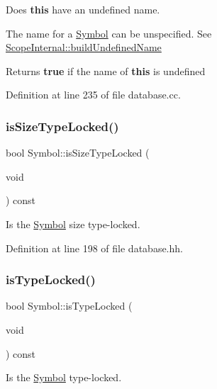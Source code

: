 Does {\bfseries{this}} have an undefined name. 

The name for a \mbox{\hyperlink{class_symbol}{Symbol}} can be unspecified. See \mbox{\hyperlink{class_scope_internal_a17225ae39210e0dbf1efb1a3ee847d72}{Scope\+Internal\+::build\+Undefined\+Name}} \begin{DoxyReturn}{Returns}
{\bfseries{true}} if the name of {\bfseries{this}} is undefined 
\end{DoxyReturn}


Definition at line 235 of file database.\+cc.

\mbox{\label{class_symbol_aefe77804a5ec24f78ac90a9ac96c59ff}} 
\subsubsection{\texorpdfstring{isSizeTypeLocked()}{isSizeTypeLocked()}}
{\footnotesize\ttfamily bool Symbol\+::is\+Size\+Type\+Locked (\begin{DoxyParamCaption}\item[{void}]{ }\end{DoxyParamCaption}) const\hspace{0.3cm}{\ttfamily [inline]}}



Is the \mbox{\hyperlink{class_symbol}{Symbol}} size type-\/locked. 



Definition at line 198 of file database.\+hh.

\mbox{\label{class_symbol_a5c0cc31605bc3b58315e31ec444a9834}} 
\subsubsection{\texorpdfstring{isTypeLocked()}{isTypeLocked()}}
{\footnotesize\ttfamily bool Symbol\+::is\+Type\+Locked (\begin{DoxyParamCaption}\item[{void}]{ }\end{DoxyParamCaption}) const\hspace{0.3cm}{\ttfamily [inline]}}



Is the \mbox{\hyperlink{class_symbol}{Symbol}} type-\/locked. 




